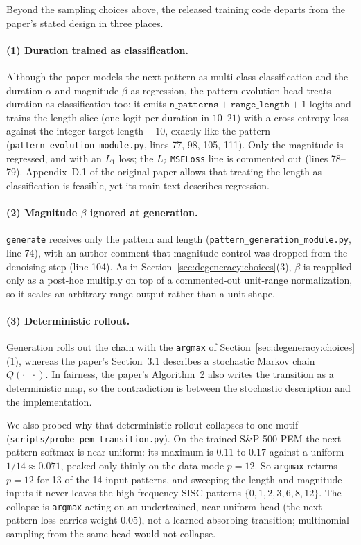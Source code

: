 \documentclass{article}
\begin{document}
Beyond the sampling choices above, the released training code departs from the paper's stated design in three places.

\paragraph{(1) Duration trained as classification.} Although the paper models the next pattern as multi-class classification and the duration $\alpha$ and magnitude $\beta$ as regression, the pattern-evolution head treats duration as classification too: it emits $\texttt{n\_patterns}+\texttt{range\_length}+1$ logits and trains the length slice (one logit per duration in $10$--$21$) with a cross-entropy loss against the integer target $\text{length}-10$, exactly like the pattern (\texttt{pattern\_evolution\_module.py}, lines 77, 98, 105, 111). Only the magnitude is regressed, and with an $L_1$ loss; the $L_2$ \texttt{MSELoss} line is commented out (lines 78--79). Appendix~D.1 of the original paper allows that treating the length as classification is feasible, yet its main text describes regression.

\paragraph{(2) Magnitude $\beta$ ignored at generation.} \texttt{generate} receives only the pattern and length (\texttt{pattern\_generation\_module.py}, line 74), with an author comment that magnitude control was dropped from the denoising step (line 104). As in Section~\ref{sec:degeneracy:choices}(3), $\beta$ is reapplied only as a post-hoc multiply on top of a commented-out unit-range normalization, so it scales an arbitrary-range output rather than a unit shape.

\paragraph{(3) Deterministic rollout.} Generation rolls out the chain with the \texttt{argmax} of Section~\ref{sec:degeneracy:choices}(1), whereas the paper's Section~3.1 describes a stochastic Markov chain $Q(\cdot\,|\,\cdot)$. In fairness, the paper's Algorithm~2 also writes the transition as a deterministic map, so the contradiction is between the stochastic description and the implementation.

We also probed why that deterministic rollout collapses to one motif (\texttt{scripts/probe\_pem\_transition.py}). On the trained S\&P 500 PEM the next-pattern softmax is near-uniform: its maximum is $0.11$ to $0.17$ against a uniform $1/14\approx0.071$, peaked only thinly on the data mode $p{=}12$. So \texttt{argmax} returns $p{=}12$ for 13 of the 14 input patterns, and sweeping the length and magnitude inputs it never leaves the high-frequency SISC patterns $\{0,1,2,3,6,8,12\}$. The collapse is \texttt{argmax} acting on an undertrained, near-uniform head (the next-pattern loss carries weight $0.05$), not a learned absorbing transition; multinomial sampling from the same head would not collapse.
\end{document}
